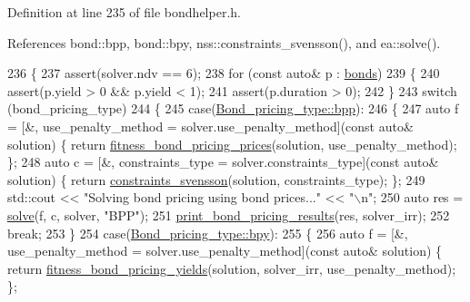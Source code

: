 Definition at line 235 of file bondhelper.\+h.



References bond\+::bpp, bond\+::bpy, nss\+::constraints\+\_\+svensson(), and ea\+::solve().


\begin{DoxyCode}
236     \{
237         assert(solver.ndv == 6);
238         \textcolor{keywordflow}{for} (\textcolor{keyword}{const} \textcolor{keyword}{auto}& p : \hyperlink{classbond_1_1_bond_helper_a61db751f82d46ce2f7f5032ff2a3b03e}{bonds})
239         \{
240             assert(p.yield > 0 && p.yield < 1);
241             assert(p.duration > 0);
242         \}
243         \textcolor{keywordflow}{switch} (bond\_pricing\_type)
244         \{
245         \textcolor{keywordflow}{case}(\hyperlink{namespacebond_a7ff8132c72465682a65a634ca0958df9a0c68c2daa0334704116676287d54c2ae}{Bond\_pricing\_type::bpp}):
246         \{
247             \textcolor{keyword}{auto} f = [&, use\_penalty\_method = solver.use\_penalty\_method](\textcolor{keyword}{const} \textcolor{keyword}{auto}& solution) \{ \textcolor{keywordflow}{return} 
      \hyperlink{classbond_1_1_bond_helper_a507eddab3d55ad3e640dfa930dcf43d0}{fitness\_bond\_pricing\_prices}(solution, use\_penalty\_method); \};
248             \textcolor{keyword}{auto} c = [&, constraints\_type = solver.constraints\_type](\textcolor{keyword}{const} \textcolor{keyword}{auto}& solution) \{ \textcolor{keywordflow}{return} 
      \hyperlink{namespacenss_a39de3569a71e773f9da82c713eb7e6eb}{constraints\_svensson}(solution, constraints\_type); \};
249             std::cout << \textcolor{stringliteral}{"Solving bond pricing using bond prices..."} << \textcolor{stringliteral}{"\(\backslash\)n"};
250             \textcolor{keyword}{auto} res = \hyperlink{namespaceea_a6450b5bf61e9fdca8b6c19267e14c560}{solve}(f, c, solver, \textcolor{stringliteral}{"BPP"});
251             \hyperlink{classbond_1_1_bond_helper_a28159ce3ba6b11611d6368fd5a601f45}{print\_bond\_pricing\_results}(res, solver\_irr);
252             \textcolor{keywordflow}{break};
253         \}
254         \textcolor{keywordflow}{case}(\hyperlink{namespacebond_a7ff8132c72465682a65a634ca0958df9afebbcc7d14e1ada7b0eee6411e82665b}{Bond\_pricing\_type::bpy}):
255         \{
256             \textcolor{keyword}{auto} f = [&, use\_penalty\_method = solver.use\_penalty\_method](\textcolor{keyword}{const} \textcolor{keyword}{auto}& solution) \{ \textcolor{keywordflow}{return} 
      \hyperlink{classbond_1_1_bond_helper_aa1a47c41374aee7914e9c0ac374b39e4}{fitness\_bond\_pricing\_yields}(solution, solver\_irr, use\_penalty\_method); \};

\end{DoxyCode}
